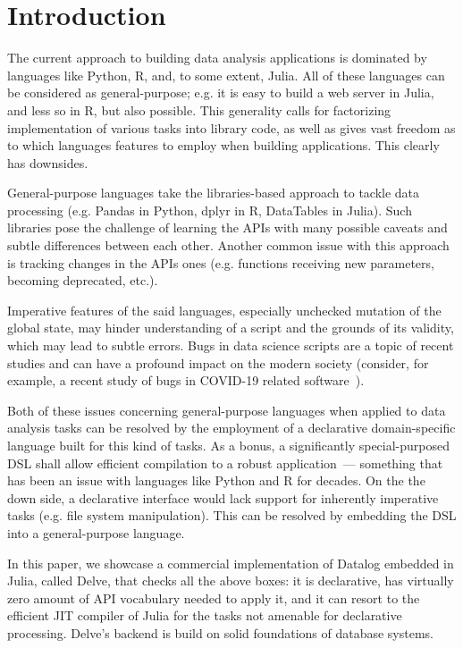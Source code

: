 \section{Introduction}

The current approach to building data analysis applications is
dominated by languages like Python, R, and, to some extent, Julia.
All of these languages can be considered as general-purpose; e.g. it is easy
to build a web server in Julia, and less so in R, but also possible.
This generality calls for factorizing implementation of various tasks into
library code, as well as gives vast freedom as to which languages
features to employ when building applications. This clearly has downsides.

General-purpose languages take the libraries-based approach to tackle
data processing (e.g. Pandas in Python, dplyr in R, DataTables in Julia).
Such libraries pose the challenge of learning the APIs with many possible
caveats and subtle differences between each other.
Another common issue with this approach is tracking changes in
the APIs ones (e.g. functions receiving new parameters, becoming deprecated,
etc.).

Imperative features of the said languages, especially unchecked mutation
of the global state, may hinder understanding of a script and the grounds
of its validity, which may lead to subtle errors. Bugs in data science
scripts are a topic of recent studies and can have a profound impact on
the modern society (consider, for example, a recent study of bugs in COVID-19
related software~\cite{bugscovid}).

Both of these issues concerning general-purpose languages when applied to
data analysis tasks can be resolved by the employment of a declarative
domain-specific language built for this kind of tasks.
As a bonus, a significantly special-purposed DSL shall
allow efficient compilation to a robust application~--- something that
has been an issue with languages like Python and R for decades.
On the the down side, a declarative interface would lack support
for inherently imperative tasks (e.g. file system manipulation).
This can be resolved by embedding the DSL into a general-purpose
language.

In this paper, we showcase a commercial implementation of Datalog
embedded in Julia, called Delve, that checks all the above boxes: it is declarative,
has virtually zero amount of API vocabulary needed to apply it,
and it can resort to the efficient JIT compiler of Julia for the tasks
not amenable for declarative processing. Delve's backend is build on solid
foundations of database systems.

